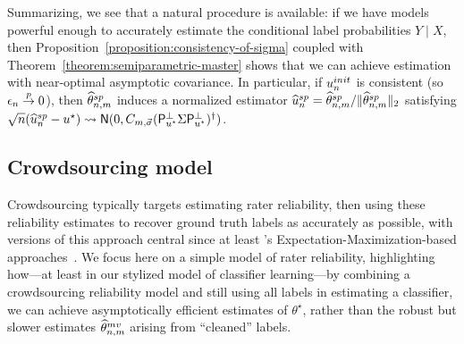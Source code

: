 \documentclass[11pt]{article}
\newcommand{\ha}[1]{\textcolor{ha}{[HA: #1]}}
\newcommand{\prns}[1]{({#1})} %
\newcommand{\what}[1]{\widehat{#1}}
\newcommand{\normal}{\mathsf{N}}
\newcommand{\sem}{^{\textup{sp}}}
\newcommand{\mv}{^{\textup{mv}}}
\newcommand{\proj}{\mathsf{P}}
\newcommand{\norms}[1]{\|{#1}\|} %
\newcommand{\ltwos}[1]{\norms{#1}_2} %
\newcommand{\<}{\langle} %
\renewcommand{\>}{\rangle}
\newcommand{\cd}{\rightsquigarrow}
\newcommand{\cp}{\stackrel{p}{\rightarrow}}
\newcommand{\opt}{^\star}
\newcommand{\spe}{\what{\theta}\sem_{n,m}} %
\begin{document}
Summarizing, we see that a natural procedure is available: if we have models
powerful enough to accurately estimate the conditional label probabilities
$Y \mid X$, then Proposition~\ref{proposition:consistency-of-sigma} coupled
with Theorem~\ref{theorem:semiparametric-master} shows that we can achieve
estimation with near-optimal asymptotic covariance. In particular, if
$\uinit$ is consistent (so $\uerror_n \cp 0$), then $\spe$ induces a
normalized estimator $\what{u}\sem_n = \spe / \ltwos{\spe}$ satisfying
$\sqrt{n}(\what{u}\sem_n - u\opt) \cd \normal(0, C_{m,\vec{\sigma}}
\prns{\proj_{u\opt}^\perp \Sigma \proj_{u\opt}^\perp}^\dagger)$.



\subsection{Crowdsourcing model}
\label{sec:crowdsourcing}


Crowdsourcing typically targets estimating rater reliability, then using
these reliability estimates to recover ground truth labels as accurately as
possible, with versions of this approach central since at least
\citeauthor{DawidSk79}'s Expectation-Maximization-based
approaches~\cite{DawidSk79, WhitehillWuBeMoRu09, RaykarYuZhVaFlBoMo10}.  We
focus here on a simple model of rater reliability,
highlighting how---at least in our stylized model of classifier
learning---by combining a crowdsourcing reliability model and still using
all labels in estimating a classifier, we can achieve asymptotically
efficient estimates of $\theta\opt$, rather than the robust but slower
estimates $\what{\theta}_{n,m}\mv$ arising from ``cleaned'' labels.

\end{document}
